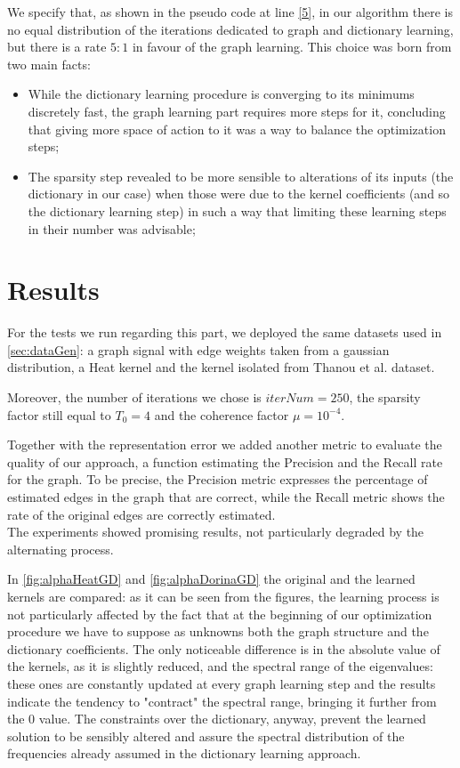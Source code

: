 We specify that, as shown in the pseudo code at line \ref{5}, in our algorithm there is no equal distribution of the iterations dedicated to graph and dictionary learning, but there is a rate $5:1$ in favour of the graph learning. This choice was born from two main facts:
\begin{itemize}
\item While the dictionary learning procedure is converging to its minimums discretely fast, the graph learning part requires more steps for it, concluding that giving more space of action to it was a way to balance the optimization steps;
\item The sparsity step revealed to be more sensible to alterations of its inputs (the dictionary in our case) when those were due to the kernel coefficients (and so the dictionary learning step) in such a way that limiting these learning steps in their number was advisable;
\end{itemize}

\section{Results}
For the tests we run regarding this part, we deployed the same datasets used in \autoref{sec:dataGen}: a graph signal with edge weights taken from a gaussian distribution, a Heat kernel and the kernel isolated from Thanou et al. dataset.

Moreover, the number of iterations we chose is $iterNum = 250$, the sparsity factor still equal to $T_0 = 4$ and the coherence factor $\mu = 10^{-4}$.

Together with the representation error we added another metric to evaluate the quality of our approach, a function estimating the Precision and the Recall rate for the graph. To be precise, the Precision metric expresses the percentage of estimated edges in the graph that are correct, while the Recall metric shows the rate of the original edges are correctly estimated.\\
The experiments showed promising results, not particularly degraded by the alternating process.

In \autoref{fig:alphaHeatGD} and \autoref{fig:alphaDorinaGD} the original and the learned kernels are compared: as it can be seen from the figures, the learning process is not particularly affected  by the fact that at the beginning of our optimization procedure we have to suppose as unknowns both the graph structure and the dictionary coefficients. The only noticeable difference is in the absolute value of the kernels, as it is slightly reduced, and the spectral range of the eigenvalues: these ones are constantly updated at every graph learning step and the results indicate the tendency to "contract" the spectral range, bringing it further from the 0 value. The constraints over the dictionary, anyway, prevent the learned solution to be sensibly altered and assure the spectral distribution of the frequencies already assumed in the dictionary learning approach.

